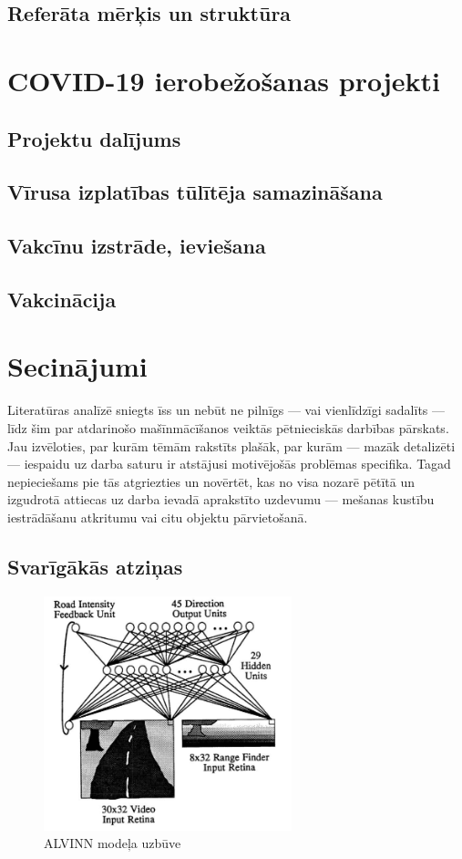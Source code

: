 \documentclass[12pt, a4paper]{article}
\numberwithin{equation}{section} %
\begin{document}
\subsection{Referāta mērķis un struktūra}

\newpage
\section{COVID-19 ierobežošanas projekti}

\subsection{Projektu dalījums}

\subsection{Vīrusa izplatības tūlītēja samazināšana}

\subsection{Vakcīnu izstrāde, ieviešana}

\subsection{Vakcinācija}


\newpage
\section{Secinājumi}

Literatūras analīzē sniegts īss un nebūt ne pilnīgs --- vai vienlīdzīgi sadalīts --- līdz šim par atdarinošo mašīnmācīšanos veiktās pētnieciskās darbības pārskats. Jau izvēloties, par kurām tēmām rakstīts plašāk, par kurām --- mazāk detalizēti --- iespaidu uz darba saturu ir atstājusi motivējošās problēmas specifika. Tagad nepieciešams pie tās atgriezties un novērtēt, kas no visa nozarē pētītā un izgudrotā attiecas uz darba ievadā aprakstīto uzdevumu --- mešanas kustību iestrādāšanu atkritumu vai citu objektu pārvietošanā.

\subsection{Svarīgākās atziņas}

\begin{figure}[t!]
    \centering
    \includegraphics[height=6.8cm,page=1]{../img/alvinn_architecture.png}
    \caption{ALVINN modeļa uzbūve \cite{enc_stim}}
\end{figure}

\newpage
{}
\printbibliography[title=Atsauces]
\end{document}
